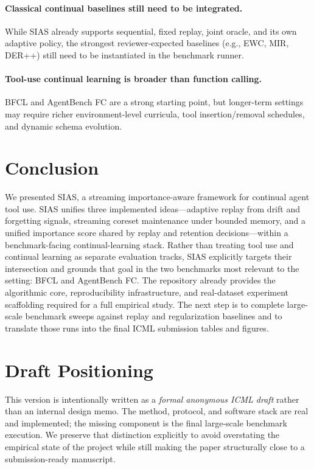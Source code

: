 \documentclass{article}
\begin{document}
\paragraph{Classical continual baselines still need to be integrated.}
While SIAS already supports sequential, fixed replay, joint oracle, and its own adaptive policy, the strongest reviewer-expected baselines (e.g., EWC, MIR, DER++) still need to be instantiated in the benchmark runner.

\paragraph{Tool-use continual learning is broader than function calling.}
BFCL and AgentBench FC are a strong starting point, but longer-term settings may require richer environment-level curricula, tool insertion/removal schedules, and dynamic schema evolution.

\section{Conclusion}

We presented SIAS, a streaming importance-aware framework for continual agent tool use. SIAS unifies three implemented ideas---adaptive replay from drift and forgetting signals, streaming coreset maintenance under bounded memory, and a unified importance score shared by replay and retention decisions---within a benchmark-facing continual-learning stack. Rather than treating tool use and continual learning as separate evaluation tracks, SIAS explicitly targets their intersection and grounds that goal in the two benchmarks most relevant to the setting: BFCL and AgentBench FC. The repository already provides the algorithmic core, reproducibility infrastructure, and real-dataset experiment scaffolding required for a full empirical study. The next step is to complete large-scale benchmark sweeps against replay and regularization baselines and to translate those runs into the final ICML submission tables and figures.




\appendix
\section{Draft Positioning}

This version is intentionally written as a \emph{formal anonymous ICML draft} rather than an internal design memo. The method, protocol, and software stack are real and implemented; the missing component is the final large-scale benchmark execution. We preserve that distinction explicitly to avoid overstating the empirical state of the project while still making the paper structurally close to a submission-ready manuscript.
\end{document}

